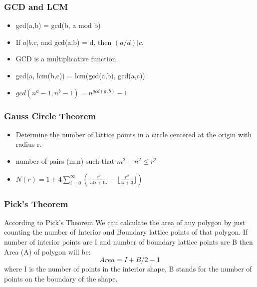 \subsubsection{GCD and LCM}
\vspace{2.5mm}
\begin{itemize}
    \item gcd(a,b) = gcd(b, a mod b)
    \item If $a | b.c$, and gcd(a,b) = d, then $(a/d)| c$.
    \item GCD is a multiplicative function.
    \item gcd(a, lcm(b,c)) = lcm(gcd(a,b), gcd(a,c))
    \item $gcd(n^a - 1, n^b - 1) = n^{gcd(a,b)} - 1$
\end{itemize}

\subsubsection{Gauss Circle Theorem}
\vspace{2.5mm}
\begin{itemize}
    \item Determine the number of lattice points in a circle centered at the origin with
          radius r.
    \item number of pairs (m,n) such that $m^2+n^2\leq r^2$
    \item $N(r) = 1+4\sum\limits_{i=0}^{\infty}(\lfloor\frac{r^2}{4i+1}\rfloor - \lfloor\frac{r^2}{4i+3}\rfloor)$
\end{itemize}
\subsubsection{Pick's Theorem}
\vspace{2.5mm}
According to Pick’s Theorem We can calculate the area of any polygon by just counting the number of Interior and Boundary lattice points of that polygon. If number of interior points are I and number of boundary lattice points are B then Area (A) of polygon will be:$$Area = I + B/2 - 1$$where I is the number of points in the interior shape, B stands for the number of points on the boundary of the shape.
